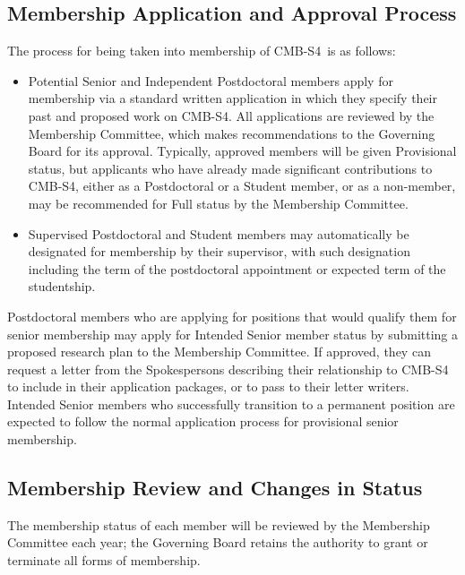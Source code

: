 \documentclass[12pt]{article}
\newcommand\collabname{CMB-S4}
\begin{document}
{\subsection{Membership Application and Approval Process}

The process for being taken into membership of \collabname\ is as follows:

\begin{itemize}

\item Potential Senior and Independent Postdoctoral members apply for membership via a standard written application in which they specify their past and proposed work on \collabname. All applications are reviewed by the Membership Committee, which makes recommendations to the Governing Board for its approval. Typically, approved members will be given Provisional status, but applicants who have already made significant contributions to CMB-S4, either as a Postdoctoral or a Student member, or as a non-member, may be recommended for Full status by the Membership Committee.

\item Supervised Postdoctoral and Student members may automatically be designated for membership by their supervisor, with such designation including the term of the postdoctoral appointment or expected term of the studentship.

\end{itemize}

Postdoctoral members who are applying for positions that would qualify them for senior membership may apply for Intended Senior member status by submitting a proposed research plan to the Membership Committee. If approved, they can request a letter from the Spokespersons describing their relationship to CMB-S4 to include in their application packages, or to pass to their letter writers.  Intended Senior members who successfully transition to a permanent position are expected to follow the normal application process for provisional senior membership.

\subsection{Membership Review and Changes in Status}

The membership status of each member will be reviewed by the Membership Committee each year; the Governing Board retains the authority to grant or terminate all forms of membership.

}
\end{document}
